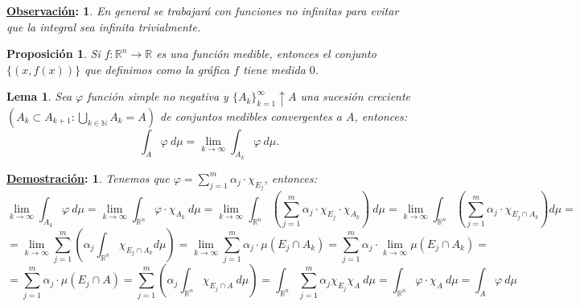 \documentclass[10pt,a4paper,openright]{book}
\theoremstyle{break}
\newtheorem*{lema}{Lema}
\newtheorem*{prop}{Proposición}
\newtheorem*{demo}{\underline{Demostración}:}
\newtheorem*{obs}{\underline{Observación}:}
\begin{document}
\begin{obs}
En general se trabajará con funciones no infinitas para evitar que la integral sea infinita trivialmente.
\end{obs}

\begin{prop}
Si $f:\mathbb{R}^n\rightarrow \mathbb{R}$ es una función medible, entonces el conjunto $\{(x, f(x))\}$ que definimos como la gráfica $f$ tiene medida $0$.
\end{prop}

\begin{lema}
Sea $\varphi$ función simple no negativa y $\{A_k\}_{k=1}^{\infty}\uparrow A$ una sucesión creciente $\left(A_k \subset A_{k+1} : \bigcup_{k \in \mathbb{N}} A_k = A\right)$ de conjuntos medibles convergentes a $A$, entonces:
$$\int_A \varphi \ d \mu = \lim_{k\rightarrow\infty} \int_{A_k} \varphi \ d \mu.$$
\end{lema}
\begin{demo}
Tenemos que $\varphi = \sum_{j=1}^{m} \alpha_j \cdot \chi_{E_j}$, entonces:
$$\lim_{k\rightarrow\infty} \int_{A_k} \varphi \ d \mu = \lim_{k\rightarrow\infty} \int_{\mathbb{R}^n}\varphi \cdot \chi_{A_k} \ d \mu = \lim_{k\rightarrow\infty} \int_{\mathbb{R}^n} \left(\sum_{j=1}^{m} \alpha_j \cdot \chi_{E_j}\cdot \chi_{A_k}\right) \ d \mu= \lim_{k\rightarrow\infty} \int_{\mathbb{R}^n} \left(\sum_{j=1}^{m} \alpha_j \cdot \chi_{E_j \cap A_k}\right) d \mu = $$
$$= \lim_{k\rightarrow\infty} \sum_{j=1}^{m} \left( \alpha_j \int_{\mathbb{R}^n} \chi_{E_j \cap A_k} d \mu \right) = \lim_{k\rightarrow\infty} \sum_{j=1}^{m} \alpha_j \cdot \mu\left(E_j \cap A_k\right) = \sum_{j=1}^{m} \alpha_j \cdot \lim_{k\rightarrow\infty} \mu\left(E_j \cap A_k\right) = $$
$$= \sum_{j=1}^{m} \alpha_j \cdot \mu\left(E_j \cap A\right) = \sum_{j=1}^{m} \left(\alpha_j \int_{\mathbb{R}^n} \chi_{E_j \cap A} \ d \mu\right) = \int_{\mathbb{R}^n}\sum_{j=1}^{m} \alpha_j \chi_{E_j} \chi_{A} \ d \mu= \int_{\mathbb{R}^n} \varphi \cdot \chi_A \ d \mu = \int_A \varphi \ d \mu$$
\end{demo}
\end{document}
